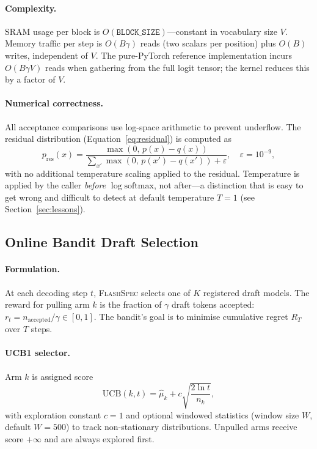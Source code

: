 \documentclass[11pt]{article}
\newcommand{\flashspec}{\textsc{FlashSpec}}
\begin{document}
\paragraph{Complexity.}
SRAM usage per block is $O(\texttt{BLOCK\_SIZE})$---constant in vocabulary
size $V$.
Memory traffic per step is $O(B\gamma)$ reads (two scalars per position)
plus $O(B)$ writes, independent of $V$.
The pure-PyTorch reference implementation incurs $O(B\gamma V)$ reads when
gathering from the full logit tensor; the kernel reduces this by a factor of
$V$.

\paragraph{Numerical correctness.}
All acceptance comparisons use log-space arithmetic to prevent underflow.
The residual distribution (Equation~\ref{eq:residual}) is computed as
\begin{equation}
p_{\text{res}}(x) = \frac{\max(0,\, p(x) - q(x))}%
  {\sum_{x'}\max(0,\, p(x') - q(x')) + \varepsilon},\quad \varepsilon=10^{-9},
\end{equation}
with no additional temperature scaling applied to the residual.
Temperature is applied by the caller \emph{before} $\log\mathrm{softmax}$,
not after---a distinction that is easy to get wrong and difficult to detect
at default temperature $T=1$ (see Section~\ref{sec:lessons}).

\subsection{Online Bandit Draft Selection}
\label{sec:bandit}

\paragraph{Formulation.}
At each decoding step $t$, \flashspec{} selects one of $K$ registered draft
models.
The reward for pulling arm $k$ is the fraction of $\gamma$ draft tokens
accepted: $r_t = n_{\text{accepted}} / \gamma \in [0,1]$.
The bandit's goal is to minimise cumulative regret $R_T$ over $T$ steps.

\paragraph{UCB1 selector.}
Arm $k$ is assigned score
\begin{equation}
  \mathrm{UCB}(k, t) = \hat{\mu}_k + c\sqrt{\frac{2\ln t}{n_k}},
\end{equation}
with exploration constant $c=1$ and optional windowed statistics
(window size $W$, default $W=500$) to track non-stationary distributions.
Unpulled arms receive score $+\infty$ and are always explored first.
\end{document}
